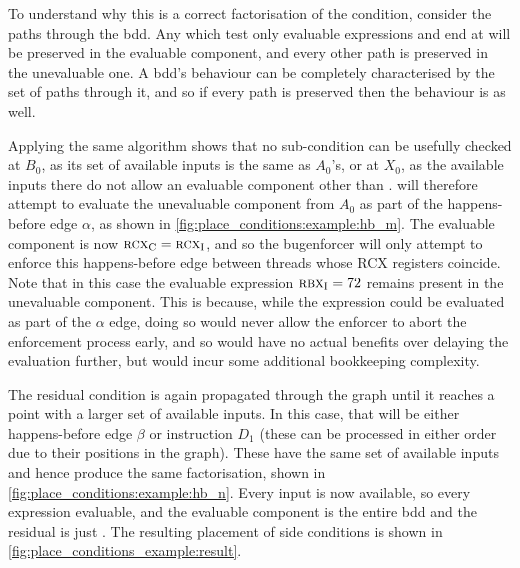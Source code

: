 To understand why this is a correct factorisation of the condition,
consider the paths through the \gls{bdd}.  Any which test only
evaluable expressions and end at {\false} will be preserved in the
evaluable component, and every other path is preserved in the
unevaluable one.  A \gls{bdd}'s behaviour can be completely
characterised by the set of paths through it, and so if every path is
preserved then the behaviour is as well.

Applying the same algorithm shows that no sub-condition can be
usefully checked at $B_0$, as its set of available inputs is the same
as $A_0$'s, or at $X_0$, as the available inputs there do not allow an
evaluable component other than \true.  {\Technique} will therefore
attempt to evaluate the unevaluable component from $A_0$ as part of
the happens-before edge $\alpha$, as shown in
\autoref{fig:place_conditions:example:hb_m}.  The evaluable component
is now $\textsc{rcx}_{\mathrm{C}} = \textsc{rcx}_{\mathrm{I}}$, and so the \gls{bugenforcer}
will only attempt to enforce this happens-before edge between threads
whose RCX registers coincide.  Note that in this case the evaluable
expression $\textsc{rbx}_{\mathrm{I}} = 72$ remains present in the unevaluable
component.  This is because, while the expression could be evaluated
as part of the $\alpha$ edge, doing so would never allow the enforcer
to abort the enforcement process early, and so would have no actual
benefits over delaying the evaluation further, but would incur some
additional bookkeeping complexity.

The residual condition is again propagated through the graph until it
reaches a point with a larger set of available inputs.  In this case,
that will be either happens-before edge $\beta$ or instruction $D_1$
(these can be processed in either order due to their positions in the
graph).  These have the same set of available inputs and hence produce
the same factorisation, shown in
\autoref{fig:place_conditions:example:hb_n}.  Every input is now
available, so every expression evaluable, and the evaluable component
is the entire \gls{bdd} and the residual is just {\true}.  The
resulting placement of \glspl{side condition} is shown in
\autoref{fig:place_conditions_example:result}.

